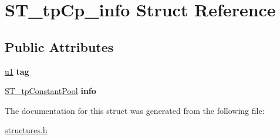 \hypertarget{structST__tpCp__info}{}\section{S\+T\+\_\+tp\+Cp\+\_\+info Struct Reference}
\label{structST__tpCp__info}
\subsection*{Public Attributes}
\begin{DoxyCompactItemize}
\item 
\mbox{\label{structST__tpCp__info_ab5d858580c6b89584dbe79615560b485}} 
\mbox{\hyperlink{structures_8h_ad9f4cdb6757615aae2fad89dab3c5470}{u1}} {\bfseries tag}
\item 
\mbox{\label{structST__tpCp__info_ae0e5e366079a768bb1f22ba2935e54eb}} 
\mbox{\hyperlink{unionST__tpConstantPool}{S\+T\+\_\+tp\+Constant\+Pool}} {\bfseries info}
\end{DoxyCompactItemize}


The documentation for this struct was generated from the following file\+:\begin{DoxyCompactItemize}
\item 
\mbox{\hyperlink{structures_8h}{structures.\+h}}\end{DoxyCompactItemize}
